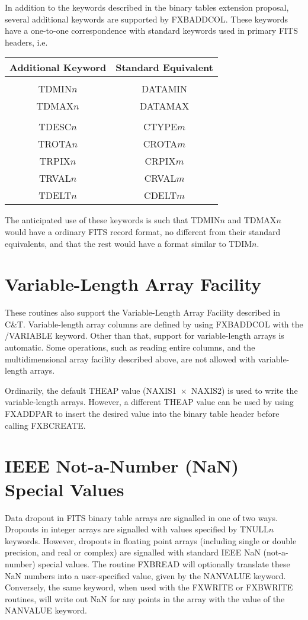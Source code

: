 In addition to the keywords described in the binary tables extension proposal,
several additional keywords are supported by FXBADDCOL.  These keywords have a
one-to-one correspondence with standard keywords used in primary FITS headers,
i.e.
\begin{center}
\begin{tabular}{cc}
Additional Keyword	& Standard Equivalent\\
\hline
			&	\\
TDMIN$n$		& DATAMIN \\
TDMAX$n$		& DATAMAX \\
			&	\\
TDESC$n$		& CTYPE$m$ \\
TROTA$n$		& CROTA$m$ \\
TRPIX$n$		& CRPIX$m$ \\
TRVAL$n$		& CRVAL$m$ \\
TDELT$n$		& CDELT$m$ \\
\end{tabular}
\end{center}
The anticipated use of these keywords is such that TDMIN$n$ and TDMAX$n$ would
have a ordinary FITS record format, no different from their standard
equivalents, and that the rest would have a format similar to TDIM$n$.

\section{Variable-Length Array Facility}

These routines also support the Variable-Length Array Facility described in
C\&T\@.  Variable-length array columns are defined by using FXBADDCOL with the
/VARIABLE keyword.  Other than that, support for variable-length arrays is
automatic.  Some operations, such as reading entire columns, and the
multidimensional array facility described above, are not allowed with
variable-length arrays.

Ordinarily, the default THEAP value \mbox{(NAXIS1 $\times$ NAXIS2)} is used to
write the variable-length arrays.  However, a different THEAP value can be used
by using FXADDPAR to insert the desired value into the binary table header
before calling FXBCREATE.

\section{IEEE Not-a-Number (NaN) Special Values}

Data dropout in FITS binary table arrays are signalled in one of two ways.
Dropouts in integer arrays are signalled with values specified by TNULL$n$
keywords.  However, dropouts in floating point arrays (including single or
double precision, and real or complex) are signalled with standard IEEE NaN
(not-a-number) special values.  The routine FXBREAD will optionally translate
these NaN numbers into a user-specified value, given by the NANVALUE keyword.
Conversely, the same keyword, when used with the FXWRITE or FXBWRITE routines,
will write out NaN for any points in the array with the value of the NANVALUE
keyword.

